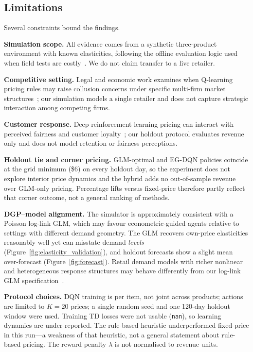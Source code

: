 \documentclass[journal, 10pt, twoside]{IEEEtran}
\begin{document}
\subsection{Limitations}

Several constraints bound the findings.

\smallskip\noindent\textbf{Simulation scope.}
All evidence comes from a synthetic three-product environment with known
elasticities, following the offline evaluation logic used when field
tests are costly~\cite{nambiar2022, xia2024}.
We do not claim transfer to a live retailer.

\smallskip\noindent\textbf{Competitive setting.}
Legal and economic work examines when Q-learning pricing rules may raise
collusion concerns under specific multi-firm market
structures~\cite{denboer2024}; our simulation models a single retailer and
does not capture strategic interaction among competing firms.

\smallskip\noindent\textbf{Customer response.}
Deep reinforcement learning pricing can interact with perceived fairness
and customer loyalty~\cite{wang2025loyalty}; our holdout protocol
evaluates revenue only and does not model retention or fairness
perceptions.

\smallskip\noindent\textbf{Holdout tie and corner pricing.}
GLM-optimal and EG-DQN policies coincide at the grid minimum
(\$6) on every holdout day, so the experiment does not explore interior
price dynamics and the hybrid adds no out-of-sample revenue over
GLM-only pricing.
Percentage lifts versus fixed-price therefore partly reflect that corner
outcome, not a general ranking of methods.

\smallskip\noindent\textbf{DGP--model alignment.}
The simulator is approximately consistent with a Poisson log-link GLM,
which may favour econometric-guided agents relative to settings with
different demand geometry.
The GLM recovers own-price elasticities reasonably well yet can
misstate demand \emph{levels} (Figure~\ref{fig:elasticity_validation}),
and holdout forecasts show a slight mean over-forecast
(Figure~\ref{fig:forecast}).
Retail demand models with richer nonlinear and heterogeneous response
structures may behave differently from our log-link GLM
specification~\cite{orspectrum2024}.

\smallskip\noindent\textbf{Protocol choices.}
DQN training is per item, not joint across products; actions are limited
to $K=20$ prices; a single random seed and one 120-day holdout window
were used.
Training TD losses were not usable (\texttt{nan}), so learning dynamics
are under-reported.
The rule-based heuristic underperformed fixed-price in this run---a
weakness of that heuristic, not a general statement about rule-based
pricing.
The reward penalty $\lambda$ is not normalised to revenue units.
\end{document}
